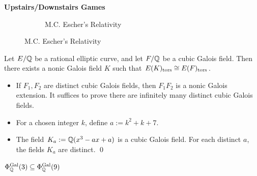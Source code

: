 \begin{frame}[plain] \frametitle{}
	\vspace{1cm} \vfill 
	
	\begin{center}
	{\color{SwarthGarnet}\Large\bfseries Upstairs/Downstairs Games}
	\end{center}
	
	\begin{figure}[h,t]
	\centering
	\begin{subfigure}{\textwidth}
	\captionsetup{labelformat=empty}
	\centering
	\caption{M.C. Escher's Relativity}
	\end{subfigure}
	\end{figure}
\end{frame}



\begin{frame}[plain]
\begin{prop}
Let $E/\mathbb{Q}$ be a rational elliptic curve, and let $F/\mathbb{Q}$ be a cubic Galois field. Then there exists a nonic Galois field $K$ such that $E(K)_{\text{tors}} \cong E(F)_{\text{tors}}$.
\end{prop}

\pf 
\begin{itemize}
\item If $F_1, F_2$ are distinct cubic Galois fields, then $F_1F_2$ is a nonic Galois extension. It suffices to prove there are infinitely many distinct cubic Galois fields. 
\item For a chosen integer $k$, define $a:= k^2 + k + 7$.
\item The field $K_a:= \mathbb{Q}(x^3 - ax + a)$ is a cubic Galois field. For each distinct $a$, the fields $K_a$ are distinct. \hfill\qed
\end{itemize}

\begin{cor}
$\Phi_{\mathbb{Q}}^{\operatorname{Gal}}(3) \subseteq \Phi_{\mathbb{Q}}^{\operatorname{Gal}}(9)$
\end{cor}
\end{frame}



